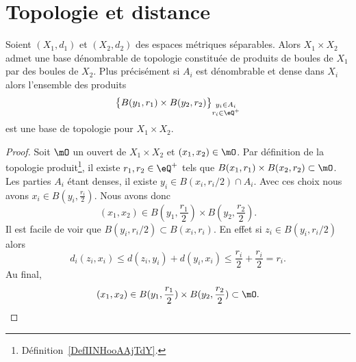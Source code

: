 
\section{Topologie et distance}


\begin{lemma}   \label{LemDUJXooWsnmpL}
    Soient \( (X_1,d_1)\) et \( (X_2,d_2)\) des espaces métriques séparables. Alors \( X_1\times X_2\) admet une base dénombrable de topologie constituée de produits de boules de \( X_1\) par des boules de \( X_2\). Plus précisément si $A_i$ est dénombrable et dense dans \( X_i\) alors l'ensemble des produits
    \begin{equation}
        \big\{ B(y_1,r_1)\times B(y_2,r_2)\big\}_{\substack{y_i\in A_i\\r_i\in \eQ^+}}
    \end{equation}
    est une base de topologie pour \( X_1\times X_2\).
\end{lemma}

\begin{proof}
    Soit \( \mO\) un ouvert de \( X_1\times X_2\) et \( (x_1,x_2)\in \mO\). Par définition de la topologie produit\footnote{Définition~\ref{DefIINHooAAjTdY}.}, il existe \( r_1,r_2\in \eQ^+\) tels que \( B(x_1,r_1)\times B(x_2,r_2)\subset\mO\). Les parties \( A_i\) étant denses, il existe \( y_i\in B(x_i,r_i/2)\cap A_i\). Avec ces choix nous avons $x_i\in B(y_i,\frac{ r_i }{2})$. Nous avons donc
    \begin{equation}
        (x_1,x_2)\in B(y_1,\frac{ r_1 }{ 2 })\times B(y_2,\frac{ r_2 }{2}).
    \end{equation}
    Il est facile de voir que \( B(y_i,r_i/2)\subset B(x_i,r_i)\). En effet si \( z_i\in B(y_i,r_i/2)\) alors
    \begin{equation}
        d_i(z_i,x_i)\leq d(z_i,y_i)+d(y_i,x_i)\leq \frac{ r_i }{2}+\frac{ r_i }{2}=r_i.
    \end{equation}
    Au final,
    \begin{equation}
        (x_1,x_2)\in B(y_1,\frac{ r_1 }{ 2 })\times B(y_2,\frac{ r_2 }{2})\subset \mO.
    \end{equation}
\end{proof}



